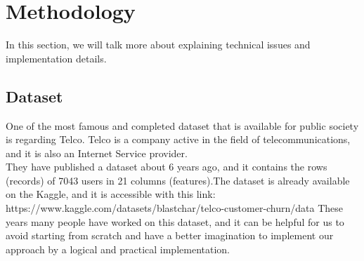 \documentclass[12pt]{article}
\begin{document}
\section{Methodology}
In this section, we will talk more about explaining technical issues and implementation details.

\subsection{Dataset}
One of the most famous and completed dataset that is available for public society is regarding Telco.
Telco is a company active in the field of telecommunications, and it is also an Internet Service provider.\\
They have published a dataset about 6 years ago, and it contains the rows (records) of 7043 users in 21 columns (features).The dataset is already available on the Kaggle, and it is accessible with this link:\\
\vspace{\baselineskip} \newline
https://www.kaggle.com/datasets/blastchar/telco-customer-churn/data
\vspace{\baselineskip} \newline
These years many people have worked on this dataset, and it can be helpful for us to avoid starting from scratch and have a better imagination to implement our approach by a logical and practical implementation.
\end{document}
